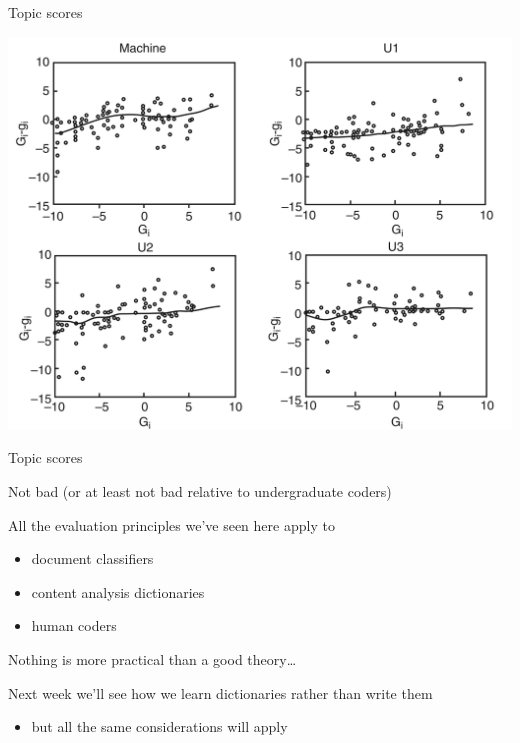 \documentclass{hertieteaching}
\begin{document}
\begin{frame}{Topic scores}

\centerline{\includegraphics[scale=0.4]{pictures/kinglowe}}
\end{frame}

\begin{frame}{Topic scores}

Not bad (or at least not bad relative to undergraduate coders)

All the evaluation principles we've seen here apply to 
\begin{itemize}
  \item document classifiers
  \item content analysis dictionaries
  \item human coders
\end{itemize}
Nothing is more practical than a good theory\ldots 

\pause
\bigskip


Next week we'll see how we learn dictionaries rather than write them
\begin{itemize}
  \item but all the same considerations will apply
\end{itemize}


\end{frame}



\end{document}
